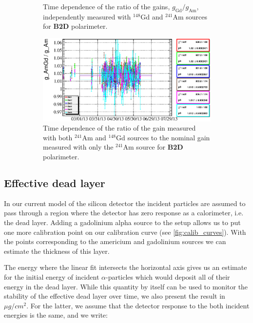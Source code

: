 \documentclass[a4paper,12pt]{article}
\newcommand\americium{${}^{241}$Am}
\newcommand\gadolinium{${}^{148}$Gd}
\begin{document}
\begin{figure}
\begin{subfigure}[t]{0.49\textwidth}
\caption{Time dependence of the ratio of the gains, $g_\text{Gd}/g_\text{Am}$,
independently measured with \gadolinium{} and \americium{} sources for
\textbf{B2D} polarimeter.}
\end{subfigure}
%
\hfill
%
\begin{subfigure}[t]{0.49\textwidth}
\includegraphics[width=\textwidth]{gfx/run13_alpha_study/B2D/c_chAmGdGain_over_AmGain_by_day_B2D.eps}
\caption{Time dependence of the ratio of the gain measured with both \americium{} and
\gadolinium{} sources to the nominal gain measured with only the \americium{}
source for \textbf{B2D} polarimeter.}
\end{subfigure}
\caption{\gainrealationslabel{}}
\label{fig:gain_relations}
\end{figure}


\subsection{Effective dead layer}

In our current model of the silicon detector the incident particles are assumed
to pass through a region where the detector has zero response as a calorimeter,
i.e. the dead layer. Adding a gadolinium alpha source to the setup allows us to
put one more calibration point on our calibration curve (see
\cref{fig:calib_curves}). With the points corresponding to the americium
and gadolinium sources we can estimate the thickness of this layer.

The energy where the linear fit intersects the horizontal axis gives us an
estimate for the initial energy of incident $\alpha$-particles which would
deposit all of their energy in the dead layer. While this quantity by itself
can be used to monitor the stability of the effective dead layer over time, we also
present the result in $\mu g/cm^2$. For the latter, we assume that the detector
response to the both incident energies is the same, and we write:
\end{document}
